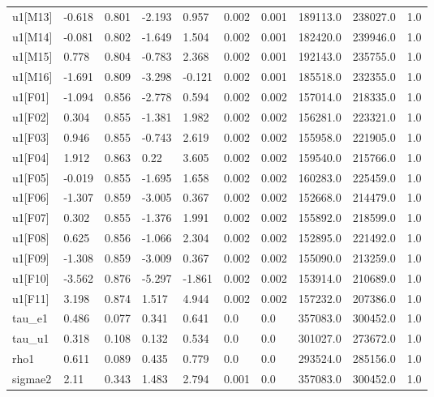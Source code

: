 \documentclass{homeworg}
\begin{document}
\begin{table}[H]
\begin{tabular}{llllllllll}
		u1{[}M13{]}  & -0.618 & 0.801 & -2.193     & 0.957       & 0.002      & 0.001    & 189113.0  & 238027.0  & 1.0    \\
		u1{[}M14{]}  & -0.081 & 0.802 & -1.649     & 1.504       & 0.002      & 0.001    & 182420.0  & 239946.0  & 1.0    \\
		u1{[}M15{]}  & 0.778  & 0.804 & -0.783     & 2.368       & 0.002      & 0.001    & 192143.0  & 235755.0  & 1.0    \\
		u1{[}M16{]}  & -1.691 & 0.809 & -3.298     & -0.121      & 0.002      & 0.001    & 185518.0  & 232355.0  & 1.0    \\
		u1{[}F01{]}  & -1.094 & 0.856 & -2.778     & 0.594       & 0.002      & 0.002    & 157014.0  & 218335.0  & 1.0    \\
		u1{[}F02{]}  & 0.304  & 0.855 & -1.381     & 1.982       & 0.002      & 0.002    & 156281.0  & 223321.0  & 1.0    \\
		u1{[}F03{]}  & 0.946  & 0.855 & -0.743     & 2.619       & 0.002      & 0.002    & 155958.0  & 221905.0  & 1.0    \\
		u1{[}F04{]}  & 1.912  & 0.863 & 0.22       & 3.605       & 0.002      & 0.002    & 159540.0  & 215766.0  & 1.0    \\
		u1{[}F05{]}  & -0.019 & 0.855 & -1.695     & 1.658       & 0.002      & 0.002    & 160283.0  & 225459.0  & 1.0    \\
		u1{[}F06{]}  & -1.307 & 0.859 & -3.005     & 0.367       & 0.002      & 0.002    & 152668.0  & 214479.0  & 1.0    \\
		u1{[}F07{]}  & 0.302  & 0.855 & -1.376     & 1.991       & 0.002      & 0.002    & 155892.0  & 218599.0  & 1.0    \\
		u1{[}F08{]}  & 0.625  & 0.856 & -1.066     & 2.304       & 0.002      & 0.002    & 152895.0  & 221492.0  & 1.0    \\
		u1{[}F09{]}  & -1.308 & 0.859 & -3.009     & 0.367       & 0.002      & 0.002    & 155090.0  & 213259.0  & 1.0    \\
		u1{[}F10{]}  & -3.562 & 0.876 & -5.297     & -1.861      & 0.002      & 0.002    & 153914.0  & 210689.0  & 1.0    \\
		u1{[}F11{]}  & 3.198  & 0.874 & 1.517      & 4.944       & 0.002      & 0.002    & 157232.0  & 207386.0  & 1.0    \\
		tau\_e1      & 0.486  & 0.077 & 0.341      & 0.641       & 0.0        & 0.0      & 357083.0  & 300452.0  & 1.0    \\
		tau\_u1      & 0.318  & 0.108 & 0.132      & 0.534       & 0.0        & 0.0      & 301027.0  & 273672.0  & 1.0    \\
		rho1         & 0.611  & 0.089 & 0.435      & 0.779       & 0.0        & 0.0      & 293524.0  & 285156.0  & 1.0   \\
		sigmae2 & 2.11 & 0.343 & 1.483 & 2.794 & 0.001 & 0.0 & 357083.0 & 300452.0 & 1.0 \\
		 \hline\hline
	\end{tabular}
\end{table}
\end{document}
